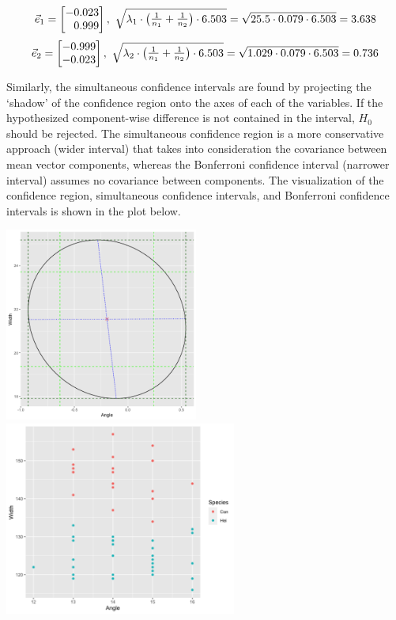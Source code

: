 \begin{enumerate}
	$$\vec{e}_1 = \m{-0.023\\0.999},\ \sqrt{\lambda_1 \cdot \p{\frac{1}{n_1}+\frac{1}{n_2}} \cdot 6.503} = \sqrt{25.5 \cdot 0.079 \cdot 6.503} = 3.638$$
	$$\vec{e}_2 = \m{-0.999\\-0.023},\ \sqrt{\lambda_2 \cdot \p{\frac{1}{n_1}+\frac{1}{n_2}} \cdot 6.503} = \sqrt{1.029 \cdot 0.079 \cdot 6.503} = 0.736$$

	Similarly, the simultaneous confidence intervals are found by projecting the `shadow' of the confidence region onto the axes of each of the variables. If the hypothesized component-wise difference is not contained in the interval, $H_0$ should be rejected. The simultaneous confidence region is a more conservative approach (wider interval) that takes into consideration the covariance between mean vector components, whereas the Bonferroni confidence interval (narrower interval) assumes no covariance between components. The visualization of the confidence region, simultaneous confidence intervals, and Bonferroni confidence intervals is shown in the plot below. 

\begin{center}
	\includegraphics[height=2.5in]{1_d_ellipse.png}
	\includegraphics[height=2.5in]{1_d_scatter.png}
\end{center}


\end{enumerate}
